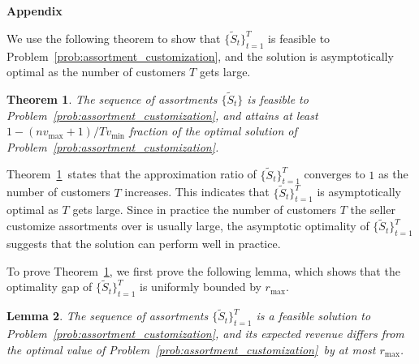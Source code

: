 \documentclass[msom,non-blindrev]{informs3} %
\newtheorem{theorem}{Theorem}
\newtheorem{lemma}[theorem]{Lemma}
\theoremstyle{definition}
\begin{document}
\begin{appendices}{\Large \noindent\textbf{Appendix}}
{We use the following theorem to show that $\{\tilde{S}_t\}_{t=1}^T$ is feasible to Problem~\eqref{prob:assortment_customization}, and the solution is asymptotically optimal as the number of customers $T$ gets large.

\begin{theorem}\label{thm:approximation_customization}
The sequence of assortments $\{\tilde{S}_{t}\}$ is feasible to Problem~\eqref{prob:assortment_customization}, and attains at least $1-(nv_{\max}+1)/Tv_{\min}$ fraction of the optimal solution of Problem~\eqref{prob:assortment_customization}.
\end{theorem}

Theorem~\ref{thm:approximation_customization}~states that the approximation ratio of $\{\tilde{S}_t\}_{t=1}^T$ converges to $1$ as the number of customers $T$ increases. This indicates that $\{\tilde{S}_t\}_{t=1}^T$ is asymptotically optimal as $T$ gets large. Since in practice the number of customers $T$ the seller customize assortments over is usually large, the asymptotic optimality of $\{\tilde{S}_t\}_{t=1}^T$ suggests that the solution can perform well in practice.

To prove Theorem~\ref{thm:approximation_customization}, we first prove the following lemma, which shows that the optimality gap of $\{\tilde{S}_t\}_{t=1}^T$ is uniformly bounded by $r_{\max}$.

\begin{lemma}\label{lemma:integrality_gap}
The sequence of assortments $\{\tilde{S}_{t}\}_{t=1}^T$ is a feasible solution to Problem~\eqref{prob:assortment_customization}, and its expected revenue differs from the optimal value of Problem~\eqref{prob:assortment_customization}~by at most $r_{\max}$.
\end{lemma}

}
\end{appendices}
\end{document}
